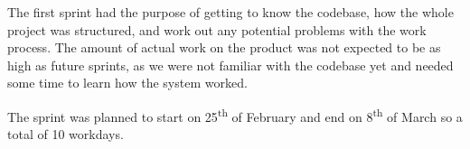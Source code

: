 The first sprint had the purpose of getting to know the codebase, how the whole project was structured, and work out any potential problems with the work process. 
The amount of actual work on the product was not expected to be as high as future sprints, as we were not familiar with the codebase yet and needed some time to learn how the system worked. 

The sprint was planned to start on 25\textsuperscript{th} of February and end on 8\textsuperscript{th} of March so a total of 10 workdays.